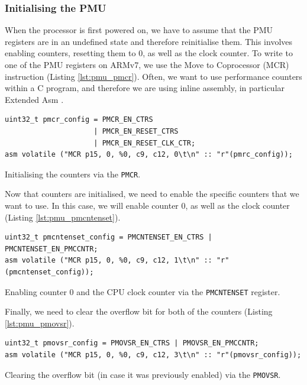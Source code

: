 {\subsubsection{Initialising the PMU}

When the processor is first powered on, we have to assume that the PMU registers are in an undefined state and therefore reinitialise them. This involves enabling counters, resetting them to 0, as well as the clock counter. To write to one of the PMU registers on ARMv7, we use the Move to Coprocessor (MCR) instruction \cite{DocsArmMCR} (Listing \ref{lst:pmu_pmcr}). Often, we want to use performance counters within a C program, and therefore we are using inline assembly, in particular Extended Asm \cite{DocsGCCExtendedAsm}.

\begin{listing}[!ht]
    \begin{verbatim}
uint32_t pmcr_config = PMCR_EN_CTRS
                     | PMCR_EN_RESET_CTRS
                     | PMCR_EN_RESET_CLK_CTR;
asm volatile ("MCR p15, 0, %0, c9, c12, 0\t\n" :: "r"(pmrc_config));
    \end{verbatim}
    \caption{Initialising the counters via the \texttt{PMCR}.}
    \label{lst:pmu_pmcr}
\end{listing}

Now that counters are initialised, we need to enable the specific counters that we want to use. In this case, we will enable counter 0, as well as the clock counter (Listing \ref{lst:pmu_pmcntenset}).

\begin{listing}[!ht]
    \begin{verbatim}
uint32_t pmcntenset_config = PMCNTENSET_EN_CTRS | PMCNTENSET_EN_PMCCNTR;
asm volatile ("MCR p15, 0, %0, c9, c12, 1\t\n" :: "r"(pmcntenset_config));
    \end{verbatim}
    \caption{Enabling counter 0 and the CPU clock counter via the \texttt{PMCNTENSET} register.}
    \label{lst:pmu_pmcntenset}
\end{listing}

Finally, we need to clear the overflow bit for both of the counters (Listing \ref{lst:pmu_pmovsr}).

\begin{listing}[!ht]
    \begin{verbatim}
uint32_t pmovsr_config = PMOVSR_EN_CTRS | PMOVSR_EN_PMCCNTR;
asm volatile ("MCR p15, 0, %0, c9, c12, 3\t\n" :: "r"(pmovsr_config));
    \end{verbatim}
    \caption{Clearing the overflow bit (in case it was previously enabled) via the \texttt{PMOVSR}.}
    \label{lst:pmu_pmovsr}
\end{listing}

}
